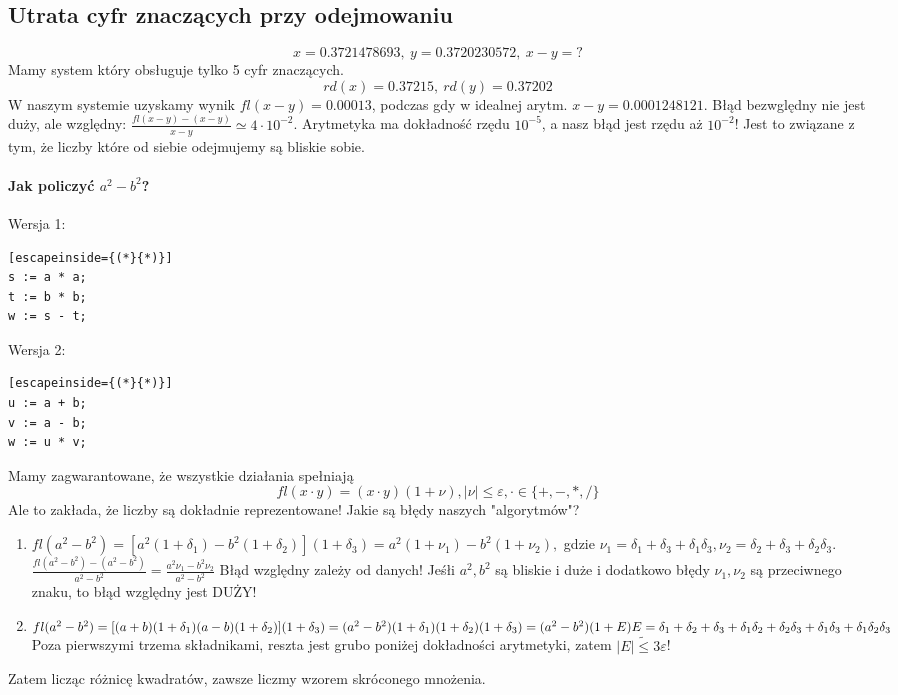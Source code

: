 \documentclass{article}
\begin{document}
\subsection{Utrata cyfr znaczących przy odejmowaniu}
$$x=0.3721478693,\ y=0.3720230572,\ x-y=?$$
Mamy system który obsługuje tylko 5 cyfr znaczących.
$$rd(x)=0.37215,\ rd(y)=0.37202$$
W naszym systemie uzyskamy wynik $ fl(x-y)=0.00013 $, podczas gdy w idealnej arytm. $ x-y=0.0001248121 $. Błąd bezwględny nie jest duży, ale względny: $ \frac{fl(x-y)-(x-y)}{x-y}\simeq 4\cdot10^{-2}$. Arytmetyka ma dokładność rzędu $ 10^{-5} $, a nasz błąd jest rzędu aż $ 10^{-2} $! Jest to związane z tym, że liczby które od siebie odejmujemy są bliskie sobie.
\paragraph{Jak policzyć $ a^2-b^2 $?} 
Wersja 1:
\begin{lstlisting}[escapeinside={(*}{*)}]
s := a * a;
t := b * b;
w := s - t;
\end{lstlisting}
Wersja 2: 
\begin{lstlisting}[escapeinside={(*}{*)}]
u := a + b;
v := a - b;
w := u * v;
\end{lstlisting}

Mamy zagwarantowane, że wszystkie działania spełniają 
$$ fl(x\cdot y)=(x\cdot y)(1+\nu), |\nu|\le \varepsilon, \cdot\in\{+,-,*,/\} $$
Ale to zakłada, że liczby są dokładnie reprezentowane!
Jakie są błędy naszych "algorytmów"?

\begin{enumerate}
	\item$fl(a^2-b^2) = [a^2(1+\delta_1)-b^2(1+\delta_2)](1+\delta_3) = a^2(1+\nu_1)-b^2(1+\nu_2), $ gdzie $ \nu_1=\delta_1+\delta_3+\delta_1\delta_3, \nu_2=\delta_2+\delta_3+\delta_2\delta_3 $.
	$ \frac{fl(a^2-b^2)-(a^2-b^2)}{a^2-b^2} = \frac{a^2\nu_1-b^2\nu_2}{a^2-b^2} $
	Błąd względny zależy od danych! Jeśłi $ a^2, b^2 $ są bliskie i duże i dodatkowo błędy $ \nu_1, \nu_2 $ są przeciwnego znaku, to błąd względny jest DUŻY!
	\item $ fl(a^2-b^2)=[(a+b)(1+\delta_1)(a-b)(1+\delta_2)](1+\delta_3)\\ =  (a^2-b^2)(1+\delta_1)(1+\delta_2)(1+\delta_3) = (a^2-b^2)(1+E)\\
	 E=\delta_1+\delta_2+\delta_3 + \delta_1\delta_2+\delta_2\delta_3+\delta_1\delta_3+\delta_1\delta_2\delta_3$
	Poza pierwszymi trzema składnikami, reszta jest grubo poniżej dokładności arytmetyki, zatem $ |E|\tilde{\le} 3\varepsilon $!
\end{enumerate}
Zatem licząc różnicę kwadratów, zawsze liczmy wzorem skróconego mnożenia.
\end{document}
